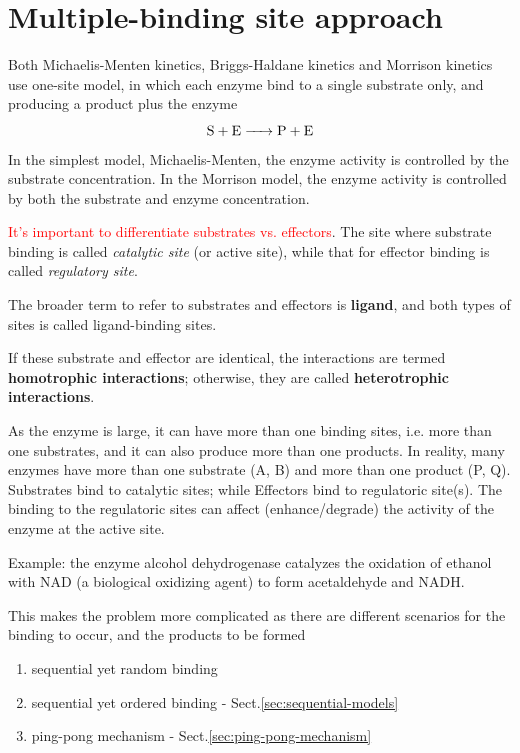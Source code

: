 \section{Multiple-binding site approach}
\label{sec:models-mult-bind}

Both Michaelis-Menten kinetics, Briggs-Haldane kinetics and Morrison
kinetics use one-site model, in which each enzyme bind to a single
substrate only, and producing a product plus the enzyme
\begin{equation}
\ce{S + E -> P + E}
\end{equation}
In the simplest model, Michaelis-Menten, the enzyme activity is controlled by
the substrate concentration. In the Morrison model, the enzyme
activity is controlled by both the substrate and enzyme concentration.

\begin{framed}
\textcolor{red}{It's important to differentiate substrates vs. effectors}.
The site where substrate binding is called {\it catalytic site} (or active
site), while that for effector binding is called {\it regulatory site}.

  The broader term to refer to substrates and effectors is  {\bf ligand}, and
  both types of sites is called ligand-binding sites.

  If these substrate and effector  are identical, the interactions are
  termed {\bf homotrophic interactions}; otherwise, they are called
  {\bf heterotrophic interactions}. 
  
\end{framed}

As the enzyme is large, it can have more than one binding sites, i.e. more than
one substrates, and it can also produce more than one products.
In reality, many enzymes have more than one substrate (A, B) and more than one
product (P, Q). Substrates bind to catalytic sites; while Effectors bind to
regulatoric site(s). The binding to the regulatoric sites can affect
(enhance/degrade) the activity of the enzyme at the active  site.

Example: the enzyme alcohol dehydrogenase catalyzes the oxidation of
ethanol with NAD (a biological oxidizing agent) to form acetaldehyde and NADH.  

This makes the problem more complicated as there are different scenarios for the
binding to occur, and the products to be formed
\begin{enumerate}
  \item sequential yet random binding
  \item sequential yet ordered binding - Sect.\ref{sec:sequential-models}
  \item ping-pong mechanism - Sect.\ref{sec:ping-pong-mechanism}
\end{enumerate}

